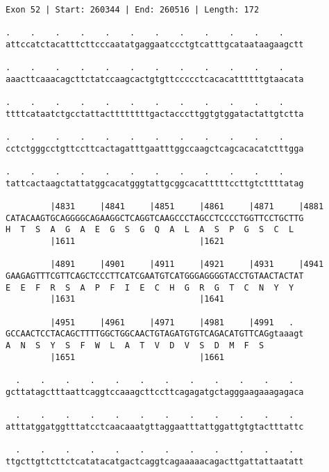 \documentclass{article}
\begin{document}
\begin{Verbatim}
Exon 52 | Start: 260344 | End: 260516 | Length: 172
 
.    .    .    .    .    .    .    .    .    .    .    .    
attccatctacatttcttcccaatatgaggaatccctgtcatttgcataataagaagctt
                                                            
.    .    .    .    .    .    .    .    .    .    .    .    
aaacttcaaacagcttctatccaagcactgtgttccccctcacacattttttgtaacata
                                                            
.    .    .    .    .    .    .    .    .    .    .    .    
ttttcataatctgcctattacttttttttgactacccttggtgtggatactattgtctta
                                                            
.    .    .    .    .    .    .    .    .    .    .    .    
cctctgggcctgttccttcactagatttgaatttggccaagctcagcacacatctttgga
                                                            
.    .    .    .    .    .    .    .    .    .    .    .    
tattcactaagctattatggcacatgggtattgcggcacatttttccttgtcttttatag
                                                            
         |4831     |4841     |4851     |4861     |4871     |4881
CATACAAGTGCAGGGGCAGAAGGCTCAGGTCAAGCCCTAGCCTCCCCTGGTTCCTGCTTG
H  T  S  A  G  A  E  G  S  G  Q  A  L  A  S  P  G  S  C  L  
         |1611                         |1621                
  
         |4891     |4901     |4911     |4921     |4931     |4941
GAAGAGTTTCGTTCAGCTCCCTTCATCGAATGTCATGGGAGGGGTACCTGTAACTACTAT
E  E  F  R  S  A  P  F  I  E  C  H  G  R  G  T  C  N  Y  Y  
         |1631                         |1641                
  
         |4951     |4961     |4971     |4981     |4991   .  
GCCAACTCCTACAGCTTTTGGCTGGCAACTGTAGATGTGTCAGACATGTTCAGgtaaagt
A  N  S  Y  S  F  W  L  A  T  V  D  V  S  D  M  F  S        
         |1651                         |1661                
  
  .    .    .    .    .    .    .    .    .    .    .    .  
gcttatagctttaattcaggtccaaagcttccttcagagatgctagggaagaaagagaca
                                                            
  .    .    .    .    .    .    .    .    .    .    .    .  
atttatggatggtttatcctcaacaaatgttaggaatttattggattgtgtactttattc
                                                            
  .    .    .    .    .    .    .    .    .    .    .    .  
ttgcttgttcttctcatatacatgactcaggtcagaaaaacagacttgattattaatatt
                                                            

\end{Verbatim}
\end{document}
